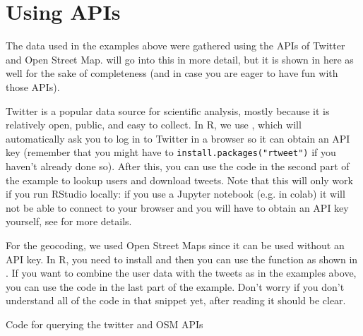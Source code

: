 \section{Using APIs}

The data used in the examples above were gathered using the APIs of Twitter and Open Street Map.
 will go into this in more detail, but it is shown in  here as well for the sake of completeness
(and in case you are eager to have fun with those APIs).

Twitter is a popular data source for scientific analysis, mostly because it is relatively open, public, and easy to collect.
In R, we use , which will automatically ask you to log in to Twitter in a browser so it can obtain an API key
(remember that you might have to \verb|install.packages("rtweet")| if you haven't already done so).
After this, you can use the code in the second part of the example to lookup users and download tweets.
Note that this will only work if you run RStudio locally: if you use a Jupyter notebook (e.g. in colab)
it will not be able to connect to your browser and you will have to obtain an API key yourself,
see  for more details. 

For the geocoding, we used Open Street Maps since it can be used without an API key.
In R, you need to install  and then you can use the  function as shown in .
If you want to combine the user data with the tweets as in the examples above,
you can use the code in the last part of the example. 
Don't worry if you don't understand all of the code in that snippet yet,
after reading  it should be clear. 



\begin{ccsexample}
  \caption{Code for querying the twitter and OSM APIs}\label{ex:funapi}
  
\end{ccsexample}
